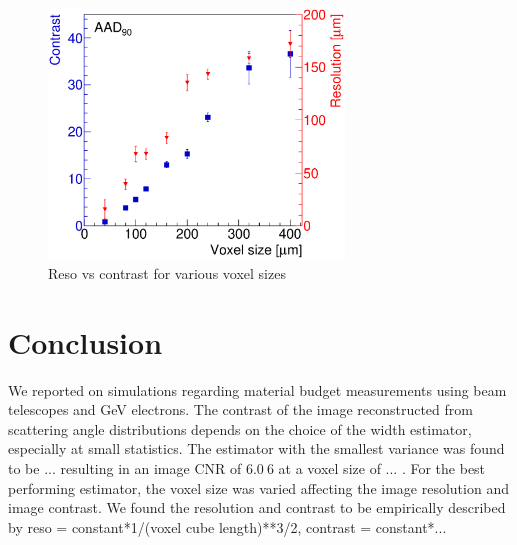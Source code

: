 \documentclass{PoS}
\begin{document}
\begin{figure}[t!]
  \centering
  \includegraphics[width=0.70\textwidth]{figures/CRvsVS.eps}
    \caption[contrast]{%
    Reso vs contrast for various voxel sizes}
  \label{fig:resovscontrast}
\end{figure}





\section{Conclusion}

We reported on simulations regarding material budget measurements using beam telescopes and GeV electrons. 
The contrast of the image reconstructed from scattering angle distributions depends on the choice of the width estimator, especially at small statistics. 
The estimator with the smallest variance was found to be ... resulting in an image CNR of $\SI{6.0}{6}$  at a voxel size of ... . %
For the best performing estimator, the voxel size was varied affecting the image resolution and image contrast. 
We found the resolution and contrast to be empirically described by reso = constant*1/(voxel cube length)**3/2, contrast = constant*...






\end{document}
